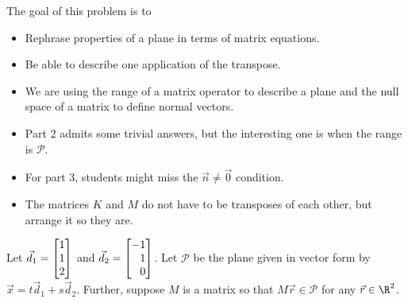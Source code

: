 \documentclass{problemset}
\newcommand{\bookonlynewpage}{\begin{bookonly}\newpage\end{bookonly}}
\begin{document}
	\bookonlynewpage
	\question
	\begin{annotation}
		\begin{goals}

			The goal of this problem is to
			\begin{itemize}
				\item Rephrase properties of a plane in terms of matrix equations.
				\item Be able to describe one application of the transpose.
			\end{itemize}
		\end{goals}

		\begin{notes}
			\begin{itemize}
				\item We are using the range of a matrix operator to describe a plane and the
					null space of a matrix to define normal vectors.
				\item Part 2 admits some trivial answers, but the interesting one is when 
					the range is $\mathcal P$.
				\item For part 3, students might miss the $\vec n\neq \vec 0$ condition.
				\item The matrices $K$ and $M$ do not have to be transposes of each other,
					but arrange it so they are.
			\end{itemize}
		\end{notes}
	\end{annotation}
	Let $\vec d_1=\mat{1\\1\\2}$ and $\vec d_2=\mat{-1\\1\\0}$.
	Let $\mathcal P$ be the plane given in vector form by $\vec x=t\vec d_1+s\vec d_2$.
	Further, suppose $M$ is a matrix so that $M\vec r\in\mathcal P$ for any $\vec r\in\R^2$.
\end{document}
